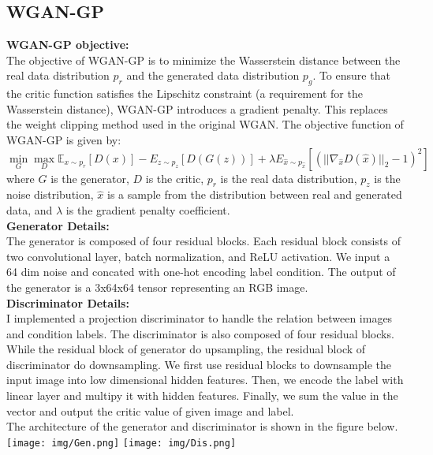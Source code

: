 \documentclass{article} %
\begin{document}
    \subsection{WGAN-GP}
    \textbf{WGAN-GP objective:} \\
    The objective of WGAN-GP is to minimize the Wasserstein distance between the real data distribution $p_r$ and the generated data distribution $p_g$. 
    To ensure that the critic function satisfies the Lipschitz constraint (a requirement for the Wasserstein distance), WGAN-GP introduces a gradient penalty. This replaces the weight clipping method used in the original WGAN.
    The objective function of WGAN-GP is given by: 
    \begin{equation}
        \min_{G} \max_{D} \mathbb{E}_{x \sim p_r} [D(x)] - {E}_{z \sim p_z} [D(G(z))] + \lambda {E}_{\hat{x} \sim p_{\hat{x}}} [(||\nabla_{\hat{x}} D(\hat{x})||_2 - 1)^2]
    \end{equation}
    where $G$ is the generator, $D$ is the critic, $p_r$ is the real data distribution, $p_z$ is the noise distribution, $\hat{x}$ is a sample from the distribution between real and generated data, and $\lambda$ is the gradient penalty coefficient. \\
    \textbf{Generator Details:} \\
    The generator is composed of four residual blocks. Each residual block consists of two convolutional layer, batch normalization, and ReLU activation. 
    We input a 64 dim noise and concated with one-hot encoding label condition. The output of the generator is a 3x64x64 tensor representing an RGB image. \\
    \textbf{Discriminator Details:} \\
    I implemented a projection discriminator to handle the relation between images and condition labels. The discriminator is also composed of four residual blocks. While the residual block of generator do upsampling, the residual block of discriminator do downsampling.
    We first use residual blocks to downsample the input image into low dimensional hidden features. Then, we encode the label with linear layer and multipy it with hidden features.
    Finally, we sum the value in the vector and output the critic value of given image and label.  \\
    The architecture of the generator and discriminator is shown in the figure below. \\
    \texttt{[image: img/Gen.png]}
    \texttt{[image: img/Dis.png]}
    
\end{document}
